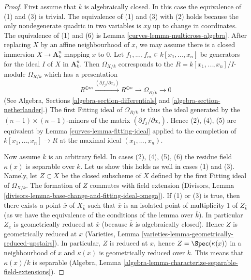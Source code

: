\begin{proof}

First assume that $k$ is algebraically closed.
In this case the equivalence of (1) and (3) is trivial.
The equivalence of (1) and (3) with (2) holds because the only
nondegenerate quadric in two variables is $xy$ up to change in
coordinates. The equivalence of (1) and (6) is
Lemma \ref{curves-lemma-multicross-algebra}.
After replacing $X$ by an affine neighbourhood
of $x$, we may assume there is a closed immersion $X \to \mathbf{A}^n_k$
mapping $x$ to $0$. Let $f_1, \ldots, f_m \in k[x_1, \ldots, x_n]$
be generators for the ideal $I$ of $X$ in $\mathbf{A}^n_k$.
Then $\Omega_{X/k}$ corresponds to the $R = k[x_1, \ldots, x_n]/I$-module
$\Omega_{R/k}$ which has a presentation
$$
R^{\oplus m} \xrightarrow{(\partial f_j/\partial x_i)}
R^{\oplus n} \to \Omega_{R/k} \to 0
$$
(See Algebra, Sections \ref{algebra-section-differentials} and
\ref{algebra-section-netherlander}.)
The first Fitting ideal of $\Omega_{R/k}$ is thus the ideal
generated by the $(n - 1) \times (n - 1)$-minors of the
matrix $(\partial f_j/\partial x_i)$. Hence (2), (4), (5)
are equivalent by Lemma \ref{curves-lemma-fitting-ideal} applied
to the completion of $k[x_1, \ldots, x_n] \to R$
at the maximal ideal $(x_1, \ldots, x_n)$.

\medskip\noindent
Now assume $k$ is an arbitrary field.
In cases (2), (4), (5), (6) the residue field $\kappa(x)$ is
separable over $k$. Let us show this holds as well
in cases (1) and (3). Namely, let $Z \subset X$ be the closed subscheme
of $X$ defined by the first Fitting ideal of $\Omega_{X/k}$.
The formation of $Z$ commutes with field extension
(Divisors, Lemma \ref{divisors-lemma-base-change-and-fitting-ideal-omega}).
If (1) or (3) is true, then there exists a point
$\overline{x}$ of $X_{\overline{k}}$ such that $\overline{x}$
is an isolated point of multiplicity $1$ of $Z_{\overline{k}}$ (as we have the
equivalence of the conditions of the lemma over $\overline{k}$).
In particular $Z_{\overline{x}}$ is geometrically reduced at $\overline{x}$
(because $\overline{k}$ is algebraically closed). Hence
$Z$ is geometrically reduced at $x$
(Varieties, Lemma \ref{varieties-lemma-geometrically-reduced-upstairs}).
In particular, $Z$ is reduced at $x$, hence $Z = \Spec(\kappa(x))$
in a neighbourhood of $x$ and $\kappa(x)$ is geometrically reduced
over $k$. This means that $\kappa(x)/k$ is separable
(Algebra, Lemma \ref{algebra-lemma-characterize-separable-field-extensions}).


\end{proof}
